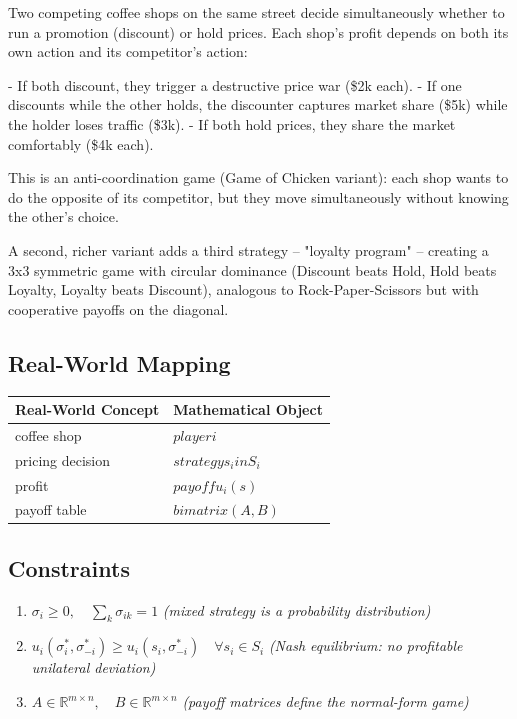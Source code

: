 \documentclass[11pt, a4paper]{article}
\begin{document}
Two competing coffee shops on the same street decide simultaneously whether to run a promotion (discount) or hold prices. Each shop's profit depends on both its own action and its competitor's action:

- If both discount, they trigger a destructive price war (\$2k each).
- If one discounts while the other holds, the discounter captures market share (\$5k) while the holder loses traffic (\$3k).
- If both hold prices, they share the market comfortably (\$4k each).

This is an anti-coordination game (Game of Chicken variant): each shop wants to do the opposite of its competitor, but they move simultaneously without knowing the other's choice.

A second, richer variant adds a third strategy -- "loyalty program" -- creating a 3x3 symmetric game with circular dominance (Discount beats Hold, Hold beats Loyalty, Loyalty beats Discount), analogous to Rock-Paper-Scissors but with cooperative payoffs on the diagonal.

\subsection{Real-World Mapping}

\begin{longtable}{ll}
\toprule
\textbf{Real-World Concept} & \textbf{Mathematical Object} \\
\midrule
\endhead
coffee shop & $player i$ \\
pricing decision & $strategy s_i in S_i$ \\
profit & $payoff u_i(s)$ \\
payoff table & $bimatrix (A, B)$ \\
\bottomrule
\end{longtable}

\subsection{Constraints}

\begin{enumerate}
  \item $\sigma_i \ge 0, \quad \sum_{k} \sigma_{ik} = 1$
  \hfill \textit{(mixed strategy is a probability distribution)}
  \item $u_i(\sigma_i^*, \sigma_{-i}^*) \ge u_i(s_i, \sigma_{-i}^*) \quad \forall s_i \in S_i$
  \hfill \textit{(Nash equilibrium: no profitable unilateral deviation)}
  \item $A \in \mathbb{R}^{m \times n}, \quad B \in \mathbb{R}^{m \times n}$
  \hfill \textit{(payoff matrices define the normal-form game)}
\end{enumerate}
\end{document}
